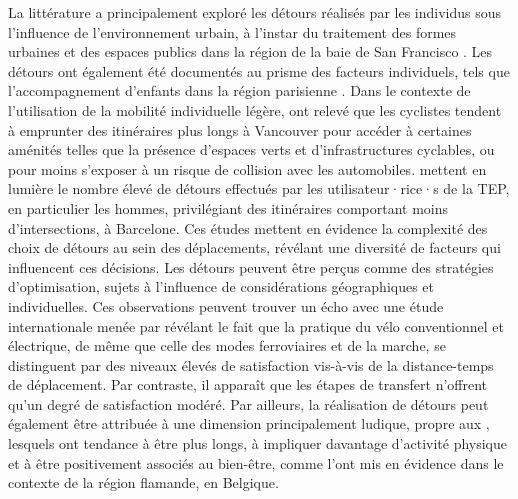 \begin{refsegment}
La littérature a principalement exploré les détours réalisés par les individus sous l'influence de l'environnement urbain, à l'instar du traitement des formes urbaines et des espaces publics dans la région de la baie de San Francisco \textcolor{blue}{\autocite[210]{cervero_travel_1997}}. Les détours ont également été documentés au prisme des facteurs individuels, tels que l'accompagnement d'enfants dans la région parisienne \textcolor{blue}{\autocite[149]{motte-baumvol_who_2017}}. Dans le contexte de l'utilisation de la mobilité individuelle légère, \textcolor{blue}{\textcite[4]{winters_how_2010}} ont relevé que les cyclistes tendent à emprunter des itinéraires plus longs à Vancouver pour accéder à certaines aménités telles que la présence d'espaces verts et d'infrastructures cyclables, ou pour moins s'exposer à un risque de collision avec les automobiles. \textcolor{blue}{\textcite[6]{cubells_e-scooter_2023}} mettent en lumière le nombre élevé de détours effectués par les utilisateur·rice·s de la \acrshort{TEP}, en particulier les hommes, privilégiant des itinéraires comportant moins d'intersections, à Barcelone. Ces études mettent en évidence la complexité des choix de détours au sein des déplacements, révélant une diversité de facteurs qui influencent ces décisions. Les détours peuvent être perçus comme des stratégies d'optimisation, sujets à l'influence de considérations géographiques et individuelles. Ces observations peuvent trouver un écho avec une étude internationale menée par \textcolor{blue}{\textcite[591]{cornet_worthwhile_2022}} révélant le fait que la pratique du vélo conventionnel et électrique, de même que celle des modes ferroviaires et de la marche, se distinguent par des niveaux élevés de satisfaction vis-à-vis de la distance-temps de déplacement. Par contraste, il apparaît que les étapes de transfert n'offrent qu'un degré de satisfaction modéré. Par ailleurs, la réalisation de détours peut également être attribuée à une dimension principalement ludique, propre aux , lesquels ont tendance à être plus longs, à impliquer davantage d'activité physique et à être positivement associés au bien-être, comme l'ont mis en évidence \textcolor{blue}{\textcite[8-9]{hook_undirected_2021}} dans le contexte de la région flamande, en Belgique.%


\end{refsegment}
